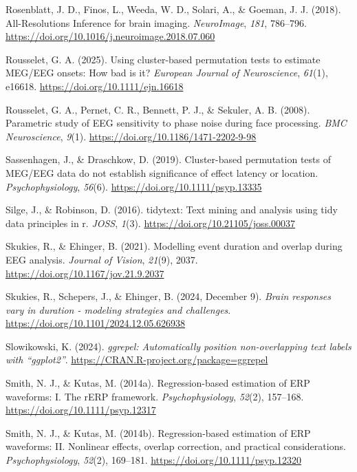 \documentclass[
  doc,
  floatsintext,
  longtable,
  a4paper,
  nolmodern,
  notxfonts,
  notimes,
  donotrepeattitle,
  colorlinks=true,linkcolor=blue,citecolor=blue,urlcolor=blue]{apa7}
\newlength{\cslhangindent}
\newenvironment{CSLReferences}[2] %
 {\begin{list}{}{%
  \setlength{\itemindent}{0pt}
  \setlength{\leftmargin}{0pt}
  \setlength{\parsep}{0pt}
  \ifodd #1
   \setlength{\leftmargin}{\cslhangindent}
   \setlength{\itemindent}{-1\cslhangindent}
  \fi
  \setlength{\itemsep}{#2\baselineskip}}}
 {\end{list}}
\begin{document}
\begin{CSLReferences}{1}{0}
Rosenblatt, J. D., Finos, L., Weeda, W. D., Solari, A., \& Goeman, J. J.
(2018). All-Resolutions Inference for brain imaging. \emph{NeuroImage},
\emph{181}, 786--796.
\url{https://doi.org/10.1016/j.neuroimage.2018.07.060}

Rousselet, G. A. (2025). Using cluster-based permutation tests to
estimate {MEG}/{EEG} onsets: {How} bad is it? \emph{European Journal of
Neuroscience}, \emph{61}(1), e16618.
\url{https://doi.org/10.1111/ejn.16618}

Rousselet, G. A., Pernet, C. R., Bennett, P. J., \& Sekuler, A. B.
(2008). Parametric study of EEG sensitivity to phase noise during face
processing. \emph{BMC Neuroscience}, \emph{9}(1).
\url{https://doi.org/10.1186/1471-2202-9-98}

Sassenhagen, J., \& Draschkow, D. (2019). Cluster{-}based permutation
tests of MEG/EEG data do not establish significance of effect latency or
location. \emph{Psychophysiology}, \emph{56}(6).
\url{https://doi.org/10.1111/psyp.13335}

Silge, J., \& Robinson, D. (2016). {tidytext}: Text mining and analysis
using tidy data principles in r. \emph{JOSS}, \emph{1}(3).
\url{https://doi.org/10.21105/joss.00037}

Skukies, R., \& Ehinger, B. (2021). Modelling event duration and overlap
during {EEG} analysis. \emph{Journal of Vision}, \emph{21}(9), 2037.
\url{https://doi.org/10.1167/jov.21.9.2037}

Skukies, R., Schepers, J., \& Ehinger, B. (2024, December 9).
\emph{Brain responses vary in duration - modeling strategies and
challenges}. \url{https://doi.org/10.1101/2024.12.05.626938}

Slowikowski, K. (2024). \emph{{ggrepel}: Automatically position
non-overlapping text labels with {``{ggplot2}''}}.
\url{https://CRAN.R-project.org/package=ggrepel}

Smith, N. J., \& Kutas, M. (2014a). Regression{-}based estimation of ERP
waveforms: I. The rERP framework. \emph{Psychophysiology}, \emph{52}(2),
157--168. \url{https://doi.org/10.1111/psyp.12317}

Smith, N. J., \& Kutas, M. (2014b). Regression{-}based estimation of ERP
waveforms: II. Nonlinear effects, overlap correction, and practical
considerations. \emph{Psychophysiology}, \emph{52}(2), 169--181.
\url{https://doi.org/10.1111/psyp.12320}


\end{CSLReferences}
\end{document}

